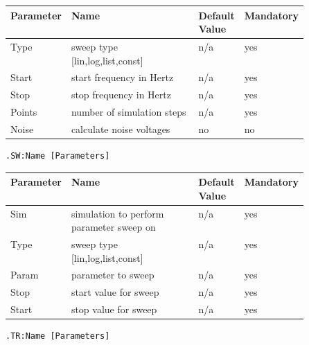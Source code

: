 \begin{tabular}{|l|p{0.5\linewidth}|l|l|}
\hline
Parameter & Name & Default Value & Mandatory \\
\hline
Type & sweep type [lin,log,list,const] & n/a & yes \\
Start & start frequency in Hertz & n/a & yes \\
Stop & stop frequency in Hertz & n/a & yes \\
Points & number of simulation steps & n/a & yes \\
Noise & calculate noise voltages & no & no \\
\hline
\end{tabular}





\begin{verbatim}
.SW:Name [Parameters]
\end{verbatim}


\begin{tabular}{|l|p{0.5\linewidth}|l|l|}
\hline
Parameter & Name & Default Value & Mandatory \\
\hline
Sim & simulation to perform parameter sweep on & n/a & yes \\
Type & sweep type [lin,log,list,const] & n/a & yes \\
Param & parameter to sweep & n/a & yes \\
Stop & start value for sweep & n/a & yes \\
Start & stop value for sweep & n/a & yes \\
\hline
\end{tabular}





\begin{verbatim}
.TR:Name [Parameters]
\end{verbatim}


